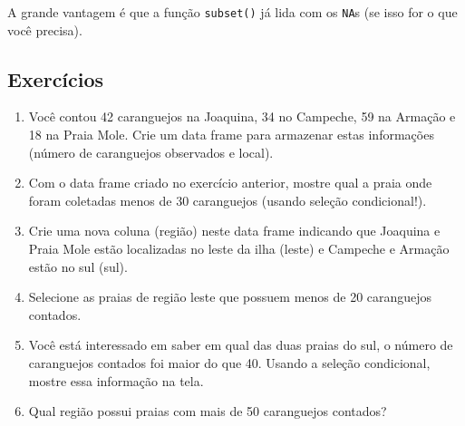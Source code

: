 \documentclass[
  10pt,
  a4paper]{book}
\newenvironment{Shaded}{\begin{snugshade}}{\end{snugshade}}
\newcommand{\AttributeTok}[1]{\textcolor[rgb]{0.77,0.63,0.00}{#1}}
\newcommand{\ConstantTok}[1]{\textcolor[rgb]{0.00,0.00,0.00}{#1}}
\newcommand{\DecValTok}[1]{\textcolor[rgb]{0.00,0.00,0.81}{#1}}
\newcommand{\FunctionTok}[1]{\textcolor[rgb]{0.00,0.00,0.00}{#1}}
\newcommand{\NormalTok}[1]{#1}
\newcommand{\SpecialCharTok}[1]{\textcolor[rgb]{0.00,0.00,0.00}{#1}}
\newcommand{\StringTok}[1]{\textcolor[rgb]{0.31,0.60,0.02}{#1}}
\providecommand{\tightlist}{%
  \setlength{\itemsep}{0pt}\setlength{\parskip}{0pt}}
\begin{document}
\begin{Shaded}
\end{Shaded}

A grande vantagem é que a função \texttt{subset()} já lida com os \texttt{NA}s (se
isso for o que você precisa).

\hypertarget{exercuxedcios-8}{%
\subsection*{Exercícios}\label{exercuxedcios-8}}


\begin{enumerate}
\def\labelenumi{\arabic{enumi}.}
\tightlist
\item
  Você contou 42 caranguejos na Joaquina, 34 no Campeche, 59 na
  Armação e 18 na Praia Mole. Crie um data frame para armazenar estas
  informações (número de caranguejos observados e local).
\item
  Com o data frame criado no exercício anterior,
  mostre qual a praia onde foram coletadas menos de 30 caranguejos
  (usando seleção condicional!).
\item
  Crie uma nova coluna (região) neste data frame indicando que
  Joaquina e Praia Mole estão localizadas no leste da ilha (leste) e
  Campeche e Armação estão no sul (sul).
\item
  Selecione as praias de região leste que possuem menos de 20
  caranguejos contados.
\item
  Você está interessado em saber em qual das duas praias do sul, o
  número de caranguejos contados foi maior do que 40. Usando a seleção
  condicional, mostre essa informação na tela.
\item
  Qual região possui praias com mais de 50 caranguejos contados?
\end{enumerate}
\end{document}

